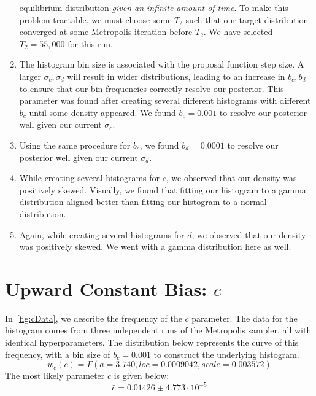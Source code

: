 \begin{enumerate}
        equilibrium distribution \emph{given an infinite amount of time}.
        To make this problem tractable, we must choose some $T_2$ such that our target distribution converged
        at some Metropolis iteration before $T_2$.
        We have selected $T_2 = 55,000$ for this run.
    \item The histogram bin size is associated with the proposal function step size.
        A larger $\sigma_c, \sigma_d$ will result in wider distributions, leading to an increase in $b_c, b_d$ to
        ensure that our bin frequencies correctly resolve our posterior.
        This parameter was found after creating several different histograms with different $b_c$ until some density
        appeared.
        We found $b_c = 0.001$ to resolve our posterior well given our current $\sigma_c$.
    \item Using the same procedure for $b_c$, we found $b_d = 0.0001$ to resolve our posterior well given our
        current $\sigma_d$.
    \item While creating several histograms for $c$, we observed that our density was positively skewed.
        Visually, we found that fitting our histogram to a gamma distribution aligned better than fitting our histogram
        to a normal distribution.
    \item Again, while creating several histograms for $d$, we observed that our density was positively skewed.
        We went with a gamma distribution here as well.
\end{enumerate}

\section{Upward Constant Bias: $c$}\label{sec:upwardConstantBias}
In~\autoref{fig:cData}, we describe the frequency of the $c$ parameter.
The data for the histogram comes from three independent runs of the Metropolis sampler, all with identical
hyperparameters.
The distribution below represents the curve of this frequency, with a bin size of $b_c = 0.001$ to construct the
underlying histogram.
\begin{equation}
    w_c(c) = \Gamma(a = 3.740, \mathit{loc} = 0.0009042, \mathit{scale} = 0.003572)
\end{equation}
The most likely parameter $\hat{c}$ is given below:
\begin{equation}
    \hat{c} = 0.01426 \pm 4.773 \cdot 10^{-5}
\end{equation}

